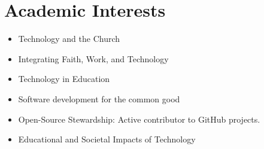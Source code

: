 \documentclass[11pt,letterpaper]{article}
\begin{document}
\section{Academic Interests}\vspace{5pt}
\begin{itemize}[noitemsep]
    \item Technology and the Church
    \item Integrating Faith, Work, and Technology
    \item Technology in Education
    \item Software development for the common good
    \item Open-Source Stewardship: Active contributor to GitHub projects.
    \item Educational and Societal Impacts of Technology

\end{itemize}

\end{document}
